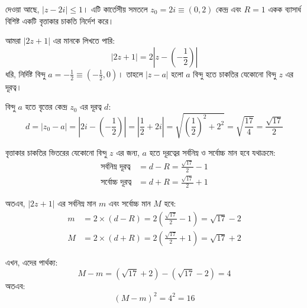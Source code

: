\documentclass[12pt, a4paper]{article}
\begin{document}
\begin{tcolorbox}[solutionbox={সমাধান (Solution)}]
    \noindent
    দেওয়া আছে, $|z - 2i| \leq 1$। এটি কার্তেসীয় সমতলে $z_0 = 2i \equiv (0, 2)$ কেন্দ্র এবং $R = 1$ একক ব্যাসার্ধ বিশিষ্ট একটি বৃত্তাকার চাকতি নির্দেশ করে। 
    
    \vspace{0.5em}
    আমরা $|2z + 1|$ এর মানকে লিখতে পারি:
    \[ |2z + 1| = 2\left|z - \left(-\frac{1}{2}\right)\right| \]
    ধরি, নির্দিষ্ট বিন্দু $a = -\frac{1}{2} \equiv \left(-\frac{1}{2}, 0\right)$। তাহলে $\left|z - a\right|$ হলো $a$ বিন্দু হতে চাকতির যেকোনো বিন্দু $z$ এর দূরত্ব। 
    
    \vspace{0.5em}
    বিন্দু $a$ হতে বৃত্তের কেন্দ্র $z_0$ এর দূরত্ব $d$:
    \[ d = |z_0 - a| = \left|2i - \left(-\frac{1}{2}\right)\right| = \left|\frac{1}{2} + 2i\right| = \sqrt{\left(\frac{1}{2}\right)^2 + 2^2} = \sqrt{\frac{17}{4}} = \frac{\sqrt{17}}{2} \]
    
    \vspace{0.5em}
    বৃত্তাকার চাকতির ভিতরের যেকোনো বিন্দু $z$ এর জন্য, $a$ হতে দূরত্বের সর্বনিম্ন ও সর্বোচ্চ মান হবে যথাক্রমে:
    \begin{align*}
        \text{সর্বনিম্ন দূরত্ব} &= d - R = \frac{\sqrt{17}}{2} - 1 \\
        \text{সর্বোচ্চ দূরত্ব} &= d + R = \frac{\sqrt{17}}{2} + 1
    \end{align*}
    
    \vspace{0.5em}
    অতএব, $|2z + 1|$ এর সর্বনিম্ন মান $m$ এবং সর্বোচ্চ মান $M$ হবে:
    \begin{align*}
        m &= 2 \times (d - R) = 2\left(\frac{\sqrt{17}}{2} - 1\right) = \sqrt{17} - 2 \\
        M &= 2 \times (d + R) = 2\left(\frac{\sqrt{17}}{2} + 1\right) = \sqrt{17} + 2
    \end{align*}
    
    \vspace{0.5em}
    এখন, এদের পার্থক্য:
    \[ M - m = (\sqrt{17} + 2) - (\sqrt{17} - 2) = 4 \]
    অতএব:
    \[ (M - m)^2 = 4^2 = 16 \]
\end{tcolorbox}

\vspace{1.5em}
\end{document}
